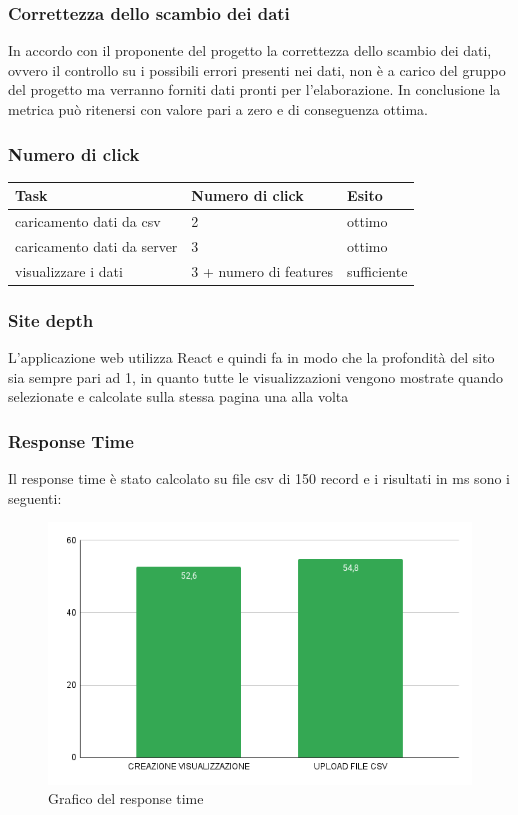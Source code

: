 \subsubsection{Correttezza dello scambio dei dati}
In accordo con il proponente del progetto la correttezza dello scambio dei dati, ovvero
il controllo su i possibili errori presenti nei dati, non è a carico del gruppo del progetto
ma verranno forniti dati pronti per l'elaborazione.
In conclusione la metrica può ritenersi con valore pari a zero e di conseguenza ottima.


\subsubsection{Numero di click}

\begin{longtabu} to \textwidth {| X[0.2,c m] | X[0.1,c m]| X[0.1,c m]| }
    \hline
    \textbf{Task} &
    \textbf{Numero di click} &
    \textbf{Esito}\\
    \hline
    caricamento dati da csv & 2 & ottimo \\ 
    \hline
    caricamento dati da server & 3 & ottimo \\
    \hline
    visualizzare i dati & 3 + numero di features & sufficiente \\
    \hline 
    \end{longtabu}

\subsubsection{Site depth}
    L'applicazione web utilizza React e quindi fa in modo che la profondità del sito sia sempre pari ad 1, in quanto tutte le visualizzazioni vengono mostrate quando selezionate e calcolate sulla stessa pagina una alla volta

    
\subsubsection{Response Time}
    Il response time è stato calcolato su file csv di 150 record e i risultati in ms sono i seguenti:

    \begin{figure}[H]
        \centering
        \includegraphics[width=10 cm]{source/sections/images/response-time.png}
        \caption{Grafico del response time}
    \end{figure}
  
